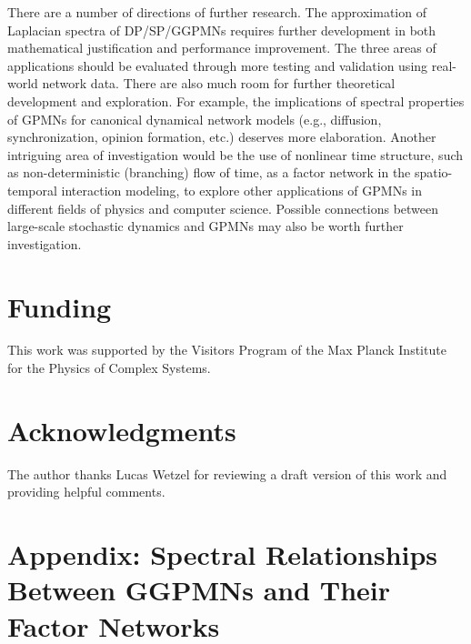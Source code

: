 \documentclass{article}
\begin{document}
There are a number of directions of further research. The
approximation of Laplacian spectra of DP/SP/GGPMNs requires further
development in both mathematical justification and performance
improvement. The three areas of applications should be evaluated
through more testing and validation using real-world network
data. There are also much room for further theoretical development and
exploration. For example, the implications of spectral properties of
GPMNs for canonical dynamical network models (e.g., diffusion,
synchronization, opinion formation, etc.) deserves more
elaboration. Another intriguing area of investigation would be the use
of nonlinear time structure, such as non-deterministic (branching)
flow of time, as a factor network in the spatio-temporal interaction
modeling, to explore other applications of GPMNs in different fields
of physics and computer science. Possible connections between
large-scale stochastic dynamics and GPMNs may also be worth further
investigation.

\section*{Funding}

This work was supported by the Visitors Program of the Max Planck Institute for the Physics of Complex Systems.

\section*{Acknowledgments}

The author thanks Lucas Wetzel for reviewing a draft version of this
work and providing helpful comments.

\appendix

\section*{Appendix: Spectral Relationships Between GGPMNs and Their Factor Networks}
\end{document}
